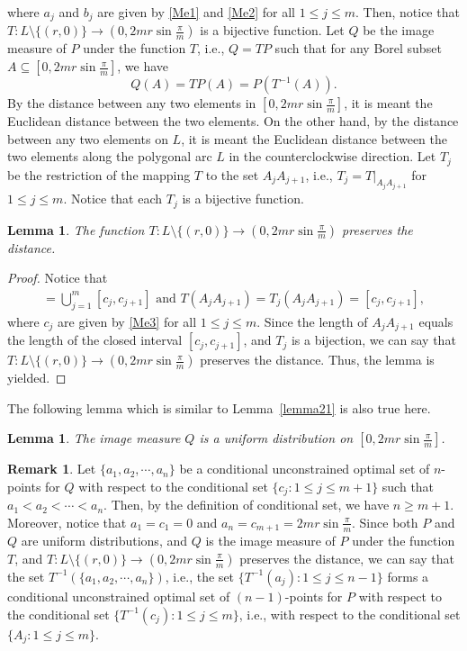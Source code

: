 \documentclass[12pt, reqno]{amsart}
\theoremstyle{plain}
\newtheorem{lemma}[subsection]{Lemma}
\theoremstyle{definition}
\newtheorem{remark}[subsection]{Remark}
\newcommand{\UU}{\bigcup}%
\newcommand{\ci}{\subseteq}%
\newcommand{\set}[1]{\{#1\}}%
\newcommand{\te}{\text}%
\begin{document}
where $a_j$ and $b_j$ are given by \eqref{Me1} and \eqref{Me2} for all  $1\leq j\leq m$. 
 Then, notice that $T : L\setminus \set{(r, 0)} \to (0, 2mr\sin \frac{\pi} m) $ is a bijective function. 
   Let $Q$ be the image measure of $P$ under the function $T$, i.e., $Q=TP$ such that for any Borel subset $A \ci [0, 2mr\sin \frac{\pi} m]$, we have 
\[Q(A)=TP(A)=P(T^{-1}(A)).\]
By the distance between any two elements in $[0, 2mr\sin \frac{\pi} m]$, it is meant the Euclidean distance between the two elements. On the other hand, by the distance between any two elements on $L$, it is meant the Euclidean distance between the two elements along the polygonal arc $L$ in the counterclockwise direction. Let $T_j$ be the restriction of the mapping $T$ to the set $A_jA_{j+1}$, i.e., $T_j=T|_{A_jA_{j+1}}$ for $1\leq j\leq m$. Notice that each $T_j$ is a bijective function.  
 \begin{lemma}\label{lemma221} 
The function $T: L\setminus \set{(r, 0)} \to (0,2mr\sin \frac{\pi} m) $ preserves the distance. 
\end{lemma} 
\begin{proof} 
Notice that 
\begin{align*} [0, 2mr\sin \frac{\pi} m]=\UU_{j=1}^m [c_j, c_{j+1}]  \te{ and } T(A_jA_{j+1})=T_j(A_jA_{j+1})=[c_j, c_{j+1}],
\end{align*}
where $c_j$ are given by \eqref{Me3} for all $1\leq j\leq m$. 
Since the length of $A_jA_{j+1}$ equals the length of the closed interval $[c_j, c_{j+1}]$, and $T_j$ is a bijection, we can say that $T: L\setminus \set{(r, 0)} \to (0,2mr\sin \frac{\pi} m) $ preserves the distance. 
Thus, the lemma is yielded. 
\end{proof} 

The following lemma which is similar to Lemma~\ref{lemma21} is also true here. 
\begin{lemma} \label{lemma211} 
The image measure $Q$ is a uniform distribution on $[0,2m r\sin \frac{\pi} m]$. 
\end{lemma} 

\begin{remark} \label{rem0} 
Let $\set{a_1, a_2, \cdots, a_n}$ be a conditional unconstrained optimal set of $n$-points for $Q$ with respect to the conditional set $\set{c_j : 1\leq j \leq m+1}$ such that $a_1<a_2<\cdots <a_n$. Then, by the definition of conditional set, we have $n\geq m+1$. Moreover, notice that $a_1=c_1=0$ and $a_n=c_{m+1}=2m r\sin \frac{\pi} m$. 
Since both $P$ and $Q$ are uniform distributions, and $Q$ is the image measure of $P$ under the function $T$, and $T: L\setminus \set{(r, 0)} \to (0, 2m r\sin \frac{\pi} m) $ preserves the distance, we can say that the set $T^{-1}(\set{a_1, a_2, \cdots, a_{n}})$, i.e., the set  $\set{T^{-1}(a_j) : 1\leq j\leq n-1}$ forms a conditional unconstrained optimal set of $(n-1)$-points for $P$ with respect to the conditional set $\set{T^{-1}(c_j) : 1\leq j\leq m}$, i.e., with respect to the conditional set $\set{A_j : 1\leq j\leq m}$. 
\end{remark}
\end{document}
